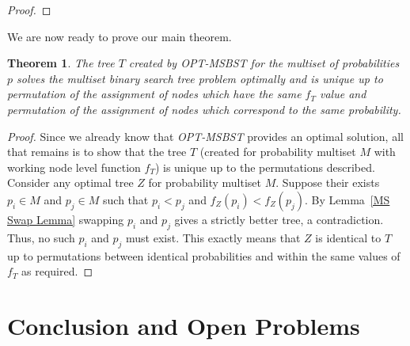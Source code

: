 \documentclass[]{beamer}
\theoremstyle{plain}
\newtheorem{thm}{Theorem}[section]
\begin{document}
\begin{frame}
\begin{proof}
\end{proof}

We are now ready to prove our main theorem.

\begin{thm}
The tree $T$ created by \textit{OPT-MSBST} for the multiset of probabilities $p$ solves the multiset binary search tree problem optimally and is unique up to permutation of the assignment of nodes which have the same $f_T$ value and permutation of the assignment of nodes which correspond to the same probability.
\end{thm}

\begin{proof}
Since we already know that \textit{OPT-MSBST} provides an optimal solution, all that remains is to show that the tree $T$ (created for probability multiset $M$ with working node level function $f_T$) is unique up to the permutations described. Consider any optimal tree $Z$ for probability multiset $M$. Suppose their exists $p_i \in M$ and $p_j \in M$ such that $p_i < p_j$ and $f_Z(p_i) < f_Z(p_j)$. By Lemma~\ref{MS Swap Lemma} swapping $p_i$ and $p_j$ gives a strictly better tree, a contradiction. Thus, no such $p_i$ and $p_j$ must exist. This exactly means that $Z$ is identical to $T$ up to permutations between identical probabilities and within the same values of $f_T$ as required.
\end{proof}
\end{frame}





\section{Conclusion and Open Problems} \label{Conclusion and Open Problems}
\end{document}

